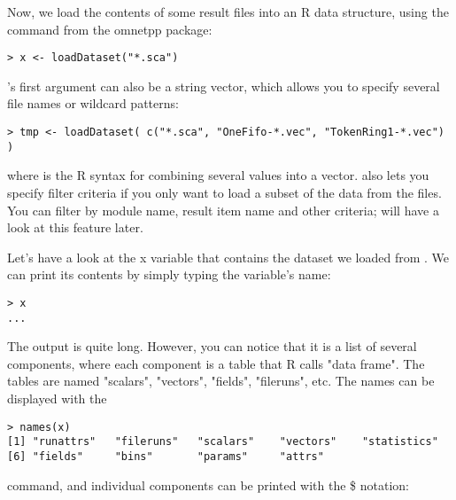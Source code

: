 Now, we load the contents of some result files into an R data structure, using
the  command from the omnetpp package:

\begin{verbatim}
> x <- loadDataset("*.sca")
\end{verbatim}

's first argument can also be a string vector, which allows you
to specify several file names or wildcard patterns:

\begin{verbatim}
> tmp <- loadDataset( c("*.sca", "OneFifo-*.vec", "TokenRing1-*.vec") )
\end{verbatim}

where  is the R syntax for combining several values into a vector.
 also lets you specify filter criteria if you only want to load
a subset of the data from the files. You can filter by module name, result item name
and other criteria; will have a look at this feature later.


Let's have a look at the x variable that contains the dataset we loaded from .
We can print its contents by simply typing the variable's name:

\begin{verbatim}
> x
...
\end{verbatim}

The output is quite long. However, you can notice that it is a list of several
components, where each component is a table that R calls "data frame".
The tables are named "scalars", "vectors", "fields", "fileruns", etc.
The names can be displayed with the

\begin{verbatim}
> names(x)
[1] "runattrs"   "fileruns"   "scalars"    "vectors"    "statistics"
[6] "fields"     "bins"       "params"     "attrs"
\end{verbatim}

command, and individual components can be printed with the \$ notation:

